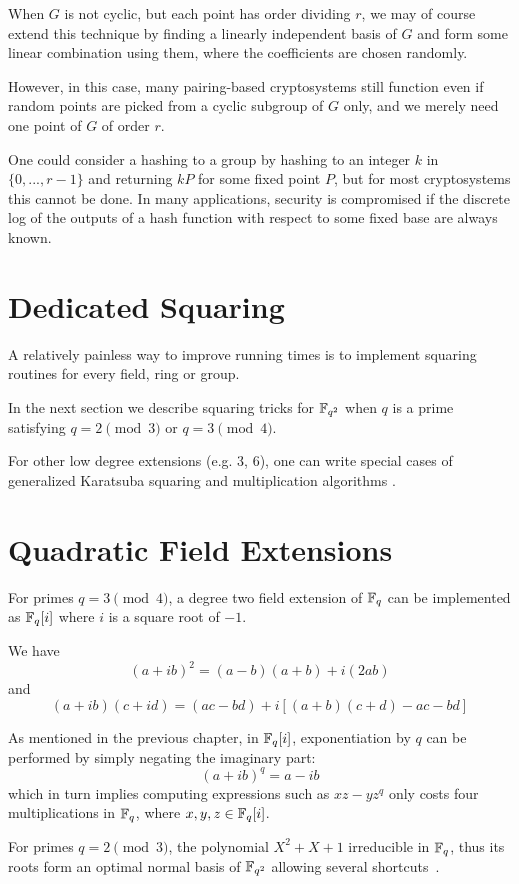 When $G$ is not cyclic, but each point has order dividing $r$,
we may of course extend this technique by finding a linearly independent
basis of $G$ and form some linear combination using them,
where the coefficients are chosen randomly.

However, in this case,
many pairing-based cryptosystems still function even if random
points are picked from a cyclic subgroup of $G$ only, and we merely need
one point of $G$ of order $r$.

One could consider a hashing to a group by
hashing to an integer $k$ in $\{0,...,r-1\}$ and returning $kP$
for some fixed point $P$, but for most cryptosystems this cannot be done.
In many applications, security is compromised if the discrete log of
the outputs of a hash function with respect to some fixed base are always
known.

\section{Dedicated Squaring}

A relatively painless way to improve running times
is to implement squaring routines for every field, ring or group.

In the next section we describe squaring tricks
for $\mathbb{F}_{q^2}$ when $q$ is a prime satisfying $q = 2 \pmod 3$
or $q = 3 \pmod 4$.

For other low degree extensions (e.g. 3, 6),
one can write special cases of generalized Karatsuba squaring and
multiplication algorithms \cite{wpkaratsuba}.

\section{\label{sec:quadext}Quadratic Field Extensions}

For primes $q=3\pmod 4$, a degree two field extension of $\mathbb{F}_q$
can be implemented as $\mathbb{F}_q[i]$ where $i$ is a square root of $-1$.

We have
\[ (a + i b)^2 = (a - b)(a + b) + i (2 a b) \]
and
\[ (a + i b)(c + i d) = (ac - bd) + i[(a + b)(c + d) - ac - bd] \]

As mentioned in the previous chapter, in $\mathbb{F}_q[i]$,
exponentiation by $q$ can be performed by simply negating the imaginary part:
\[ (a+ib)^q = a - ib \]
which in turn implies computing expressions such as $x z - y z^q$ only
costs four multiplications in $\mathbb{F}_q$, where $x,y,z \in \mathbb{F}_q[i]$.

For primes $q=2\pmod 3$,
the polynomial $X^2 + X + 1$ irreducible in $\mathbb{F}_q$, thus its roots
form an optimal normal basis of $\mathbb{F}_{q^2}$
allowing several shortcuts~\cite{xtr}.

